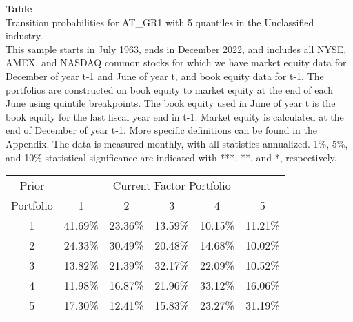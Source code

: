 \begin{table*}[ht!]
\raggedright
{}
\label{tab: transition_probs_AT_GR1_Unclassified_with_5_quantiles}
\textbf{Table \thetable} \\
Transition probabilities for AT_GR1 with 5 quantiles in the Unclassified industry. \\
\hspace*{1em}This sample starts in July 1963, ends in December 2022, and includes all NYSE, AMEX, and NASDAQ common stocks for which we have market equity data for December of year t-1 and June of year t, and book equity data for t-1. The portfolios are constructed on book equity to market equity at the end of each June using quintile breakpoints.  The book equity used in June of year t is the book equity for the last fiscal year end in t-1.  Market equity is calculated at the end of December of year t-1.  More specific definitions can be found in the Appendix.  The data is measured monthly, with all statistics annualized.  1\%, 5\%, and 10\% statistical significance are indicated with ***, **, and *, respectively. \\
\vspace{0.5em}
\centering
\begin{adjustbox}{max width=\textwidth}
\begin{tabular}{@{}cccccc@{}}
\toprule
Prior & \multicolumn{5}{c}{Current Factor Portfolio} \\
Portfolio & 1 & 2 & 3 & 4 & 5 \\
\midrule
1 & 41.69\% & 23.36\% & 13.59\% & 10.15\% & 11.21\% \\
2 & 24.33\% & 30.49\% & 20.48\% & 14.68\% & 10.02\% \\
3 & 13.82\% & 21.39\% & 32.17\% & 22.09\% & 10.52\% \\
4 & 11.98\% & 16.87\% & 21.96\% & 33.12\% & 16.06\% \\
5 & 17.30\% & 12.41\% & 15.83\% & 23.27\% & 31.19\% \\
\bottomrule
\end{tabular}
\end{adjustbox}
\end{table*}